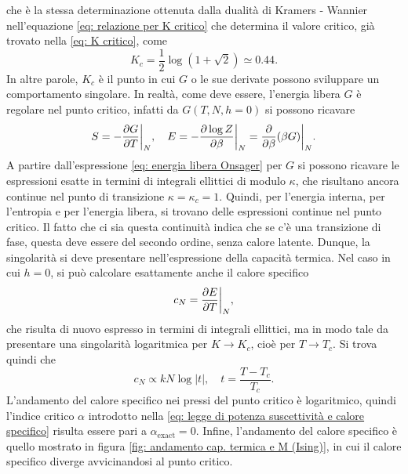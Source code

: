 che è la stessa determinazione ottenuta dalla dualità di Kramers - Wannier nell'equazione \eqref{eq: relazione per K critico} che determina il valore critico, già trovato nella \eqref{eq: K critico}, come
\begin{equation}
    K_c = \frac{1}{2} \log(1 + \sqrt{2}) \simeq 0.44.
\end{equation}
In altre parole, $K_c$ è il punto in cui $G$ o le sue derivate possono sviluppare un comportamento singolare. In realtà, come deve essere, l'energia libera $G$ è regolare nel punto critico, infatti da $G(T,N,h = 0)$ si possono ricavare
\begin{equation}
    S = -\frac{\partial G}{\partial T}\bigg|_N,
    \quad
    E = -\frac{\partial \log Z}{\partial \beta}\bigg|_N
      = \frac{\partial}{\partial \beta}(\beta G)\bigg|_N.
\end{equation}
A partire dall'espressione \eqref{eq: energia libera Onsager} per $G$ si possono ricavare le espressioni esatte in termini di integrali ellittici di modulo $\kappa$, che risultano ancora continue nel punto di transizione $\kappa = \kappa_c = 1$. Quindi, per l'energia interna, per l'entropia e per l'energia libera, si trovano delle espressioni continue nel punto critico. Il fatto che ci sia questa continuità indica che se c'è una transizione di fase, questa deve essere del secondo ordine, senza calore latente. Dunque, la singolarità si deve presentare nell'espressione della capacità termica. Nel caso in cui $h = 0$, si può calcolare esattamente anche il calore specifico 
\begin{equation}
    c_N = \frac{\partial E}{\partial T} \bigg|_N,
\end{equation}
che risulta di nuovo espresso in termini di integrali ellittici, ma in modo tale da presentare una singolarità logaritmica per $K \to K_c$, cioè per $T \to T_c$. Si trova quindi che 
\begin{equation}
    c_N \propto kN\log{|t|},\quad t = \frac{T - T_c}{T_c}.
\end{equation}
L'andamento del calore specifico nei pressi del punto critico è logaritmico, quindi l'indice critico $\alpha$ introdotto nella \eqref{eq: legge di potenza suscettività e calore specifico} risulta essere pari a $\alpha_{\mathrm{exact}} = 0$. Infine, l'andamento del calore specifico è quello mostrato in figura \ref{fig: andamento cap. termica e M (Ising)}, in cui il calore specifico diverge avvicinandosi al punto critico.

